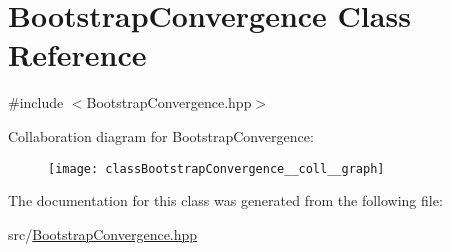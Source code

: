 \hypertarget{classBootstrapConvergence}{}\section{Bootstrap\+Convergence Class Reference}
\label{classBootstrapConvergence}


{\ttfamily \#include $<$Bootstrap\+Convergence.\+hpp$>$}



Collaboration diagram for Bootstrap\+Convergence\+:\nopagebreak
\begin{figure}[H]
\begin{center}
\leavevmode
\texttt{[image: classBootstrapConvergence\_\_coll\_\_graph]}
\end{center}
\end{figure}


The documentation for this class was generated from the following file\+:\begin{DoxyCompactItemize}
\item 
src/\hyperlink{BootstrapConvergence_8hpp}{Bootstrap\+Convergence.\+hpp}\end{DoxyCompactItemize}
